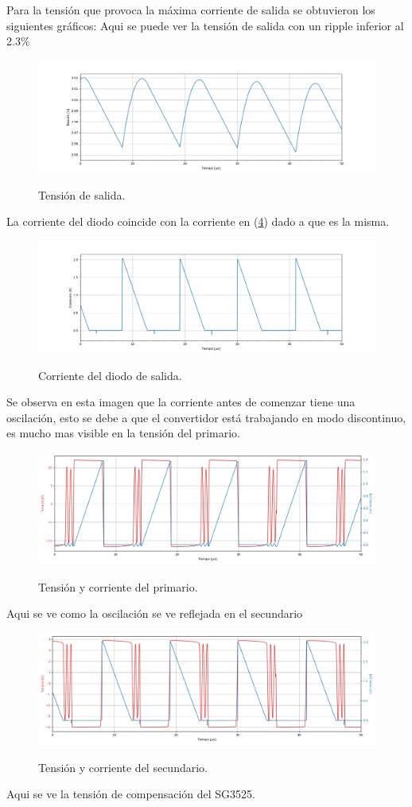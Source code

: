 Para la tensión que provoca la máxima corriente de salida se obtuvieron los siguientes gráficos:
Aqui se puede ver la tensión de salida con un ripple inferior al 2.3\%
\begin{figure}[H]
	\centering
	\includegraphics[width=\linewidth]{ImagenesParteII/ Vo.png}
	\label{fig:vo}
	\caption{Tensión de salida.}
\end{figure}
La corriente del diodo coincide con la corriente en (\ref{fig:secundario}) dado a que es la misma.
\begin{figure}[H]
	\centering
	\includegraphics[width=\linewidth]{ImagenesParteII/Idiodo.png}
	\label{fig:idiodo}
	\caption{Corriente del diodo de salida.}
\end{figure}
Se observa en esta imagen que la corriente antes de comenzar tiene una oscilación, esto se debe a que el convertidor está trabajando en modo discontinuo, es mucho mas visible en la tensión del primario.
\begin{figure}[H]
	\centering
	\includegraphics[width=0.9\linewidth]{ImagenesParteII/Primario.png}
	\label{fig:primario}
	\caption{Tensión y corriente del primario.}
\end{figure}
Aqui se ve como la oscilación se ve reflejada en el secundario
\begin{figure}[H]
	\centering
	\includegraphics[width=0.9\linewidth]{ImagenesParteII/Secundario.png}
	\label{fig:secundario}
	\caption{Tensión y corriente del secundario.}
\end{figure}
Aqui se ve la tensión de compensación del SG3525.

